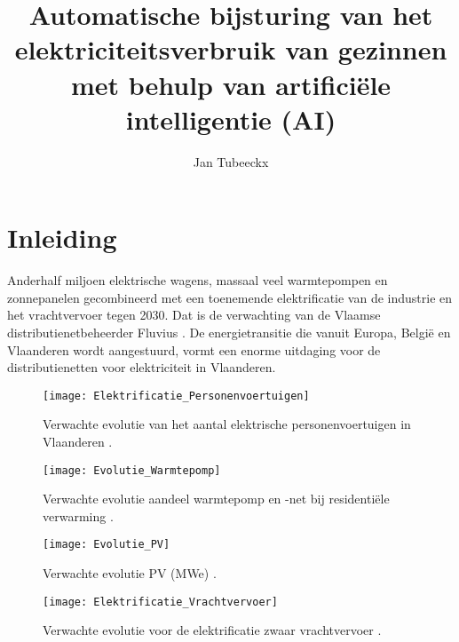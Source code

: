 \documentclass{hogent-article}
\title{Automatische bijsturing van het elektriciteitsverbruik van gezinnen met behulp van artificiële intelligentie (AI)}
\author{Jan Tubeeckx}
\begin{document}
\section{Inleiding}%
\label{sec:inleiding}
Anderhalf miljoen elektrische wagens, massaal veel warmtepompen en zonnepanelen gecombineerd met een toenemende elektrificatie van de industrie en het vrachtvervoer tegen 2030. Dat is de verwachting van de Vlaamse distributienetbeheerder Fluvius \autocite{Verdoodt2022}. De energietransitie die vanuit Europa, België en Vlaanderen wordt aangestuurd, vormt een enorme uitdaging voor de distributienetten voor elektriciteit in Vlaanderen.

\begin{figure}
    \centering\texttt{[image: Elektrificatie\_Personenvoertuigen]}
    \caption{\label{fig:Elektrificatie_Personenvoertuigen}Verwachte evolutie van het aantal
        elektrische personenvoertuigen in Vlaanderen \autocite{Verdoodt2022}.}
\end{figure}

\begin{figure}
    \centering\texttt{[image: Evolutie\_Warmtepomp]}
    \caption{\label{fig:Evolutie_Warmtepomp}Verwachte evolutie aandeel warmtepomp en -net bij
        residentiële verwarming \autocite{Verdoodt2022}.}
\end{figure}

\begin{figure}
    \centering\texttt{[image: Evolutie\_PV]}
    \caption{\label{fig:Evolutie_PV}Verwachte evolutie PV (MWe) \autocite{Verdoodt2022}.}
\end{figure}

\begin{figure}
    \centering\texttt{[image: Elektrificatie\_Vrachtvervoer]}
    \caption{\label{fig:Elektrificatie_Vrachtvervoer}Verwachte evolutie voor de elektrificatie zwaar
        vrachtvervoer \autocite{Verdoodt2022}.}
\end{figure}
\end{document}
